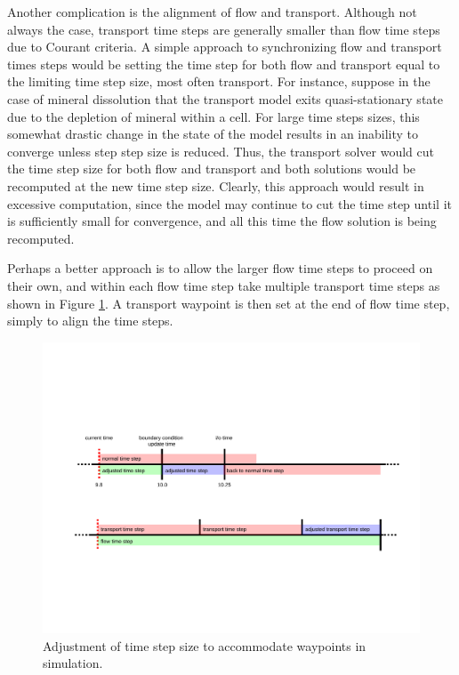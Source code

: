 \documentclass[12pt]{article}
\begin{document}
Another complication is the alignment of flow and transport.  Although not always the case, transport time steps are generally smaller than flow time steps due to Courant criteria.  A simple approach to synchronizing flow and transport times steps would be setting the time step for both flow and transport equal to the limiting time step size, most often transport.  For instance, suppose in the case of mineral dissolution that the transport model exits quasi-stationary state due to the depletion of mineral within a cell.  For large time steps sizes, this somewhat drastic change in the state of the model results in an inability to converge unless step step size is reduced.  Thus, the transport solver would cut the time step size for both flow and transport and both solutions would be recomputed at the new time step size.  Clearly, this approach would result in excessive computation, since the model may continue to cut the time step until it is sufficiently small for convergence, and all this time the flow solution is being recomputed.

Perhaps a better approach is to allow the larger flow time steps to proceed on their own, and within each flow time step take multiple transport time steps as shown in Figure \ref{ts_align}.  A transport waypoint is then set at the end of flow time step, simply to align the time steps.

\begin{figure}[h]\centering
\includegraphics[width=6.0in]{./figs/ts_alignment}
\caption{Adjustment of time step size to accommodate waypoints in simulation.}\label{ts_align}
\end{figure}
\end{document}
